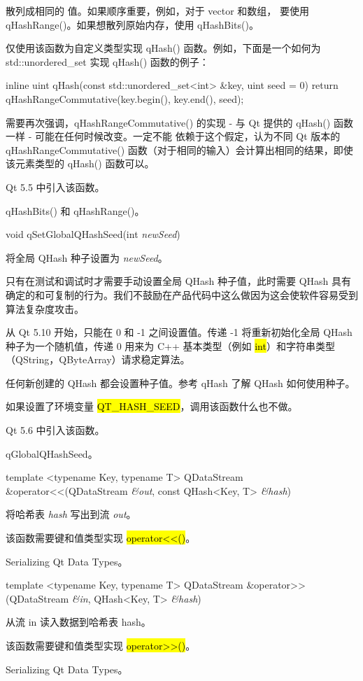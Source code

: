 散列成相同的 值。如果顺序重要，例如，对于 vector 和数组， 要使用 qHashRange()。如果想散列原始内存，使用 qHashBits()。

仅使用该函数为自定义类型实现 qHash() 函数。例如，下面是一个如何为
std::unordered\_set 实现 qHash() 函数的例子：

\begin{cppcode}
inline uint qHash(const std::unordered_set<int> &key, uint seed = 0)
{
    return qHashRangeCommutative(key.begin(), key.end(), seed);
}
\end{cppcode}

需要再次强调，qHashRangeCommutative() 的实现 - 与 Qt 提供的 qHash() 函数一样 - 可能在任何时候改变。一定不能 依赖于这个假定，认为不同 Qt 版本的 qHashRangeCommutative() 函数（对于相同的输入）会计算出相同的结果，即使该元素类型的 qHash() 函数可以。

Qt 5.5 中引入该函数。

\begin{seeAlso}
qHashBits() 和 qHashRange()。
\end{seeAlso}

void qSetGlobalQHashSeed(int \emph{newSeed})

将全局 QHash 种子设置为 \emph{newSeed}。

只有在测试和调试时才需要手动设置全局 QHash 种子值，此时需要 QHash 具有确定的和可复制的行为。我们不鼓励在产品代码中这么做因为这会使软件容易受到 算法复杂度攻击。

从 Qt 5.10 开始，只能在 0 和 -1 之间设置值。传递 -1 将重新初始化全局 QHash 种子为一个随机值，传递 0 用来为 C++ 基本类型（例如 \hl{int}）和字符串类型（QString，QByteArray）请求稳定算法。

任何新创建的 QHash 都会设置种子值。参考 qHash 了解 QHash 如何使用种子。

如果设置了环境变量 \hl{QT\_HASH\_SEED}，调用该函数什么也不做。

Qt 5.6 中引入该函数。

\begin{seeAlso}
qGlobalQHashSeed。
\end{seeAlso}

template <typename Key, typename T> QDataStream \&operator<<(QDataStream \emph{\&out}, const QHash<Key, T> \emph{\&hash})

将哈希表 \emph{hash} 写出到流 \emph{out}。

该函数需要键和值类型实现 \hl{operator<<()}。

\begin{seeAlso}
Serializing Qt Data Types。
\end{seeAlso}

template <typename Key, typename T> QDataStream \&operator>>(QDataStream \emph{\&in}, QHash<Key, T> \emph{\&hash})

从流 in 读入数据到哈希表 hash。

该函数需要键和值类型实现 \hl{operator>>()}。

\begin{seeAlso}
Serializing Qt Data Types。
\end{seeAlso}